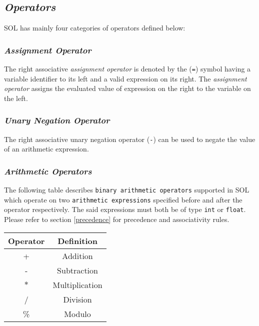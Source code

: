     \subsection{\textit{Operators}}
    SOL has mainly four categories of operators defined below:

        \subsubsection{\textit{Assignment Operator}}
        The right associative \textit{assignment operator} is denoted by the (\texttt{=}) symbol having a variable identifier to its left and a valid expression on its right. The \textit{assignment operator} assigns the evaluated value of expression on the right to the variable on the left.

        \subsubsection{\textit{Unary Negation Operator}} \label{negation}
        The right associative unary negation operator (\texttt{-}) can be used to negate the value of an arithmetic expression.

        \subsubsection{\textit{Arithmetic Operators}}
        The following table describes \texttt{binary arithmetic operators} supported in SOL which operate on two \texttt{arithmetic expressions} specified before and after the operator respectively. The said expressions must both be of type \texttt{int} or \texttt{float}. Please refer to section \ref{precedence} for precedence and associativity rules.

        \begin{center}
            \begin{tabular}{ |c|c| }
            \hline
                \textbf{Operator} & \textbf{Definition} \\
                \hline
                +   &   Addition\\
                -   &   Subtraction\\
                $*$   &   Multiplication\\
                /   &   Division\\
                \%  &   Modulo\\
            \hline
            \end{tabular}
        \end{center}

